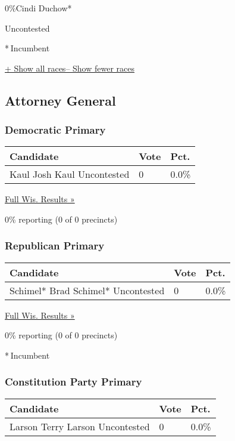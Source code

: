  0\%Cindi Duchow*

Uncontested

* Incumbent~

\protect\hyperlink{}{+ Show all races-- Show fewer races}

\hypertarget{attorney-general}{%
\subsection{Attorney General}\label{attorney-general}}

\hypertarget{democratic-primary-11}{%
\subsubsection{Democratic Primary}\label{democratic-primary-11}}

\begin{longtable}[]{@{}lll@{}}
\toprule
Candidate & Vote & Pct.\tabularnewline
\midrule
\endhead
 Kaul Josh Kaul Uncontested & 0 & 0.0\%\tabularnewline
\bottomrule
\end{longtable}

\href{https://www.nytimes3xbfgragh.onion/elections/results/wisconsin}{Full
Wis. Results »}

0\% reporting (0 of 0 precincts)

\hypertarget{republican-primary-10}{%
\subsubsection{Republican Primary}\label{republican-primary-10}}

\begin{longtable}[]{@{}lll@{}}
\toprule
Candidate & Vote & Pct.\tabularnewline
\midrule
\endhead
 Schimel* Brad Schimel* Uncontested & 0 & 0.0\%\tabularnewline
\bottomrule
\end{longtable}

\href{https://www.nytimes3xbfgragh.onion/elections/results/wisconsin}{Full
Wis. Results »}

0\% reporting (0 of 0 precincts)

* Incumbent

\hypertarget{constitution-party-primary}{%
\subsubsection{Constitution Party
Primary}\label{constitution-party-primary}}

\begin{longtable}[]{@{}lll@{}}
\toprule
Candidate & Vote & Pct.\tabularnewline
\midrule
\endhead
 Larson Terry Larson Uncontested & 0 & 0.0\%\tabularnewline
\bottomrule
\end{longtable}

